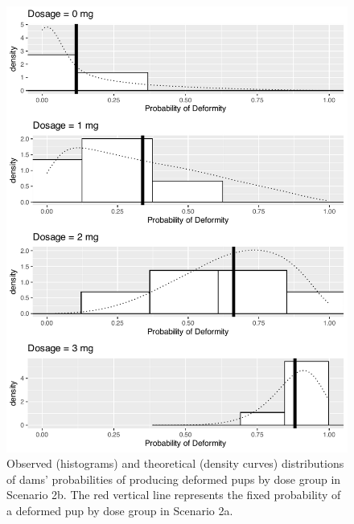 \documentclass[
]{krantz}
\begin{document}
\begin{figure}

{\centering \includegraphics[width=0.6\linewidth]{bookdown-BeyondMLR_files/figure-latex/scenario2bPlot-1} 

}

\caption{Observed (histograms) and theoretical (density curves) distributions of dams' probabilities of producing deformed pups by dose group in Scenario 2b.  The red vertical line represents the fixed probability of a deformed pup by dose group in Scenario 2a.}\label{fig:scenario2bPlot}
\end{figure}

\begin{table}

\caption{\label{tab:scenario2Tab}Summary Statistics of Scenario 2 by Dose}
\centering
{}
\end{table}
\end{document}
